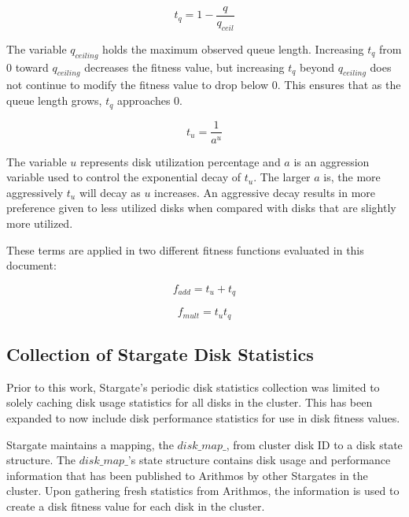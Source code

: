 \documentclass[12pt]{article}
\begin{document}
  \begin{equation}
    t_{q} = 1 - \frac{q}{q_{ceil}}
  \end{equation}

  The variable $q_{ceiling}$ holds the maximum observed queue length.
  Increasing $t_{q}$ from 0 toward $q_{ceiling}$ decreases the fitness value,
  but increasing $t_{q}$ beyond $q_{ceiling}$ does not continue to modify the
  fitness value to drop below 0. This ensures that as the queue length grows,
  $t_{q}$ approaches 0. 

  \begin{equation}
    t_{u} = \frac{1}{a^{u}}
  \end{equation}

  The variable $u$ represents disk utilization percentage and $a$ is an
  aggression variable used to control the exponential decay of $t_{u}$. The
  larger $a$ is, the more aggressively $t_{u}$ will decay as $u$ increases. An
  aggressive decay results in more preference given to less utilized disks when
  compared with disks that are slightly more utilized.

  \newpage

  These terms are applied in two different fitness functions evaluated in this
  document:

  \begin{equation} \label{eqn:additive-fitness}
    f_{add} = t_{u} + t_{q}
  \end{equation}

  \begin{equation} \label{eqn:multiplicative-fitness}
    f_{mult} = t_{u}t_{q}
  \end{equation}


  \subsection{Collection of Stargate Disk Statistics }

  Prior to this work, Stargate's periodic disk statistics collection was
  limited to solely caching disk usage statistics for all disks in the cluster.
  This has been expanded to now include disk performance statistics for use in
  disk fitness values.

  Stargate maintains a mapping, the $disk\_map\_$,
  from cluster disk ID to a disk state structure. The $disk\_map\_$'s state
  structure contains disk usage and performance information that has been
  published to Arithmos by other Stargates in the cluster. Upon gathering fresh
  statistics from Arithmos, the information is used to create a disk fitness value
  for each disk in the cluster.
\end{document}
